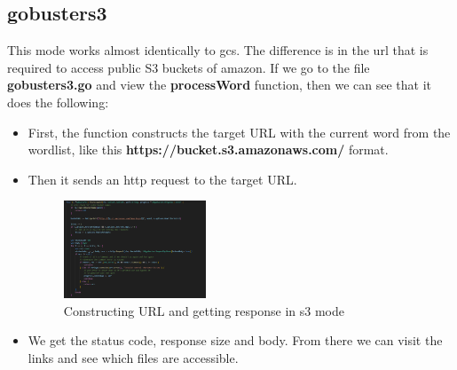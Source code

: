 \documentclass[12 pt]{article}
\begin{document}
\subsection{gobusters3}
This mode works almost identically to gcs. The difference is in the url that is required to access public S3 buckets of amazon. If we go to the file \textbf{gobusters3.go} and view the \textbf{processWord} function, then we can see that it does the following:
\begin{itemize}
    \item First, the function constructs the target URL with the current word from the wordlist, like this \textbf{https://bucket.s3.amazonaws.com/} format.
    \item Then it sends an http request to the target URL.
    \begin{figure}[H]
        \centering
        \includegraphics[width=0.4\textwidth]{Gobusters3_processWord.png}
        \caption{Constructing URL and getting response in s3 mode}
        \label{fig: Gobusters3 processWord}
    \end{figure}
    \item We get the status code, response size and body. From there we can visit the links and see which files are accessible.
\end{itemize}
\end{document}
